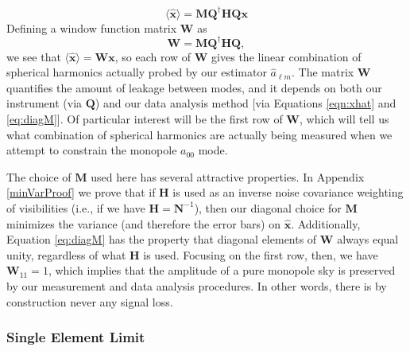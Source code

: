 \documentclass[twolcolumn,apj,iop,numberedappendix]{emulateapj}
\newcommand{\x}{\mathbf{x}}
\newcommand{\xhat}{\hat{\mathbf{x}}}
\newcommand{\N}{\mathbf{N}}
\newcommand{\Hmat}{\mathbf{H}}
\newcommand{\Q}{\mathbf{Q}}
\newcommand{\M}{\mathbf{M}}
\newcommand{\W}{\mathbf{W}}
\newcommand{\acl}[1]{{\color{red} \textbf{[ACL:  #1]}}}
\newcommand{\mep}[1]{{\color{applegreen} \textbf{[MEP:  #1]}}}
\begin{document}
\begin{equation}
\langle \xhat \rangle = \M \Q^\dagger \Hmat \Q \x
\end{equation}
Defining a window function matrix $\W$ as 
\begin{equation}
\W = \M \Q^\dagger \Hmat \Q,
\label{eq:Wform}
\end{equation}
we see that $\langle \xhat \rangle  = \W \mathbf{x}$, so each row of $\W$ gives the linear combination of spherical harmonics actually probed by our estimator $\hat{a}_{\ell m}$. The matrix $\W$ quantifies the amount of leakage between modes, and it depends on both our instrument (via $\Q$) and our data analysis method [via Equations \eqref{eqn:xhat} and \eqref{eq:diagM}]. Of particular interest will be the first row of $\W$, which will tell us what combination of spherical harmonics are actually being measured when we attempt to constrain the monopole $a_{00}$ mode.

The choice of $\M$ used here has several attractive properties. In Appendix \ref{minVarProof} we prove that if $\Hmat$ is used as an inverse noise covariance weighting of visibilities (i.e., if we have $\Hmat = \N^{-1}$), then our diagonal choice for $\M$ minimizes the variance (and therefore the error bars) on $\mathbf{\hat{x}}$. Additionally, Equation \eqref{eq:diagM} has the property that diagonal elements of $\W$ always equal unity, regardless of what $\Hmat$ is used. Focusing on the first row, then, we have $\W_{11} =1$, which implies that the amplitude of a pure monopole sky is preserved by our measurement and data analysis procedures. In other words, there is by construction never any signal loss.
%
%

\subsubsection{Single Element Limit}
\end{document}
